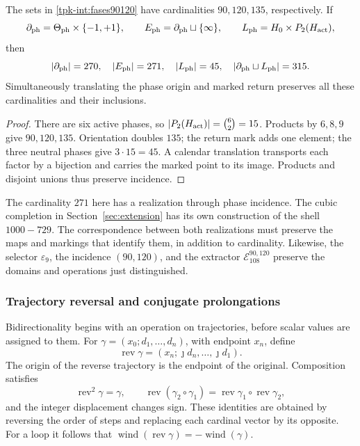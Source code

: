 \begin{proposition}
\label{tpk-int:cardinales}
The sets in \eqref{tpk-int:fases90120} have cardinalities
\(90,120,135\), respectively. If
\[
 \partial_{\rm ph}=\Theta_{\rm ph}\times\{-1,+1\},\qquad
 E_{\rm ph}=\partial_{\rm ph}\sqcup\{\infty\},\qquad
 L_{\rm ph}=H_0\times P_2(H_{\rm act}),
\]
then
\[
 |\partial_{\rm ph}|=270,\quad |E_{\rm ph}|=271,\quad
 |L_{\rm ph}|=45,\quad
 |\partial_{\rm ph}\sqcup L_{\rm ph}|=315.
\]
Simultaneously translating the phase origin and marked return preserves
all these cardinalities and their inclusions.
\end{proposition}
\begin{proof}
There are six active phases, so
\(|P_2(H_{\rm act})|=\binom62=15\). Products by
\(6,8,9\) give \(90,120,135\). Orientation doubles \(135\);
the return mark adds one element; the three neutral phases give
\(3\cdot15=45\). A calendar translation transports each
factor by a bijection and carries the marked point to its image.
Products and disjoint unions thus preserve incidence.
\end{proof}

The cardinality \(271\) here has a realization through phase
incidence. The cubic completion in Section~\ref{sec:extension} has
its own construction of the shell \(1000-729\). The correspondence
between both realizations must preserve the maps and markings that
identify them, in addition to cardinality. Likewise, the selector
\(\varepsilon_9\), the incidence \((90,120)\), and the extractor
\(\mathcal E_{108}^{90,120}\) preserve the domains and operations
just distinguished.

\subsubsection{Trajectory reversal and conjugate prolongations}
\label{tpk-int:bidireccionalidad}

Bidirectionality begins with an operation on trajectories, before
scalar values are assigned to them. For
\(\gamma=(x_0;d_1,\ldots,d_n)\), with endpoint \(x_n\), define
\[
 \operatorname{rev}\gamma
   =(x_n;\jmath d_n,\ldots,\jmath d_1).
\]
The origin of the reverse trajectory is the endpoint of the original.
Composition satisfies
\[
 \operatorname{rev}^2\gamma=\gamma,\qquad
 \operatorname{rev}(\gamma_2\circ\gamma_1)
   =\operatorname{rev}\gamma_1\circ\operatorname{rev}\gamma_2,
\]
and the integer displacement changes sign. These identities are obtained
by reversing the order of steps and replacing each cardinal vector by
its opposite. For a loop it follows that
\(\operatorname{wind}(\operatorname{rev}\gamma)
=-\operatorname{wind}(\gamma)\).

